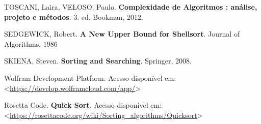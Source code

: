 \documentclass[a4paper, 12pt]{report}
\begin{document}
\noindent
TOSCANI, Laira, VELOSO, Paulo. \textbf{Complexidade de Algoritmos : análise,
projeto e métodos}. 3. ed. Bookman, 2012.

\noindent
SEDGEWICK, Robert. \textbf{A New Upper Bound for Shellsort}. Journal of Algorithms,
1986

\noindent
SKIENA, Steven. \textbf{Sorting and Searching}. Springer, 2008.

\noindent
Wolfram Development Platform. Acesso disponível em:
\textless{}\url{https://develop.wolframcloud.com/app/}\textgreater{}

\noindent
Rosetta Code. \textbf{Quick Sort}. Acesso disponível em:
\textless{}\url{https://rosettacode.org/wiki/Sorting_algorithms/Quicksort}\textgreater{}
\end{document}
